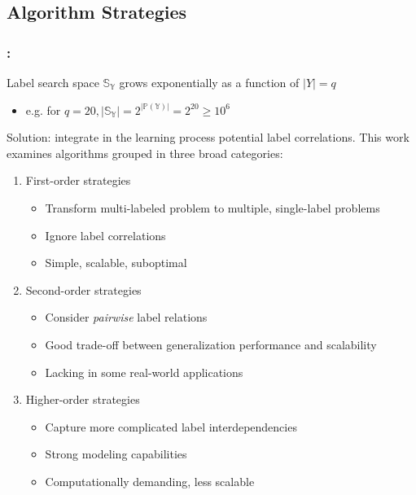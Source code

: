 \documentclass{beamer}
\begin{document}
\subsection{Algorithm Strategies}
\begin{frame}
\frametitle{\insertsection : \insertsubsection}
Label search space $\mathbb{S_Y}$ grows exponentially as a function of $|Y|=q$
\begin{itemize}
\item e.g. for $q=20, |\mathbb{S_Y}| = 2 ^ {|\mathbb{P(Y)}|} = 2^{20} \ge 10^6$
\end{itemize}
Solution: integrate in the learning process potential label correlations.
This work examines algorithms grouped in three broad categories:

\begin{enumerate}
\item First-order strategies
\begin{itemize}
\item Transform multi-labeled problem to multiple, single-label problems
\item Ignore label correlations
\item Simple, scalable, suboptimal
\end{itemize}
\item Second-order strategies
\begin{itemize}
\item Consider \emph{pairwise} label relations
\item Good trade-off between generalization performance and scalability
\item Lacking in some real-world applications
\end{itemize}
\item Higher-order strategies
\begin{itemize}
\item Capture more complicated label interdependencies
\item Strong modeling capabilities
\item Computationally demanding, less scalable
\end{itemize}

\end{enumerate}
\end{frame}

\end{document}
